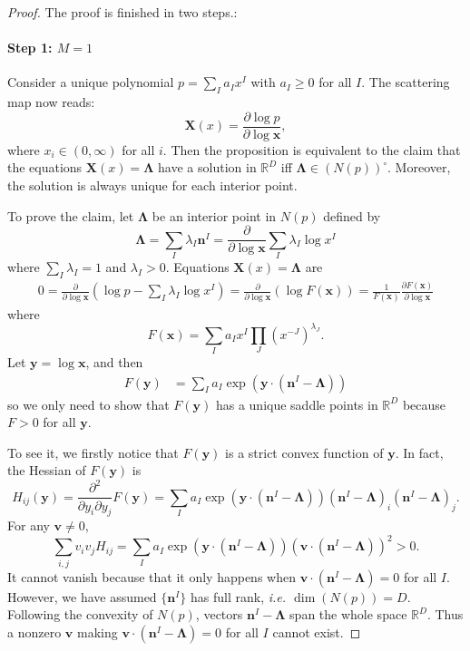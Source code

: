 \documentclass[12pt]{article}
\theoremstyle{definition}
\theoremstyle{plain}
\begin{document}
\begin{proof}
The proof is finished in two steps.:
\paragraph{Step 1: $M=1$}
Consider a unique polynomial $p=\sum_{I} a_I x^I$ with $a_I\geq 0$ for all $I$. The scattering map now reads:
\[
	\mathbf X(x)=\frac{\partial \log p}{\partial \log \mathbf x},
\]
where $x_i\in (0,\infty)$ for all $i$. Then the proposition is equivalent to the claim 
that the equations $\mathbf X(x)=\mathbf\Lambda$ have a solution in $\mathbb R^D$ 
iff $\mathbf\Lambda\in (N(p))^\circ$. Moreover, the solution is always unique for each interior point.

To prove the claim, let $\mathbf{\Lambda}$ be an interior point in $N(p)$ defined by 
\[
	\mathbf \Lambda=\sum_{I}\lambda_I\mathbf n^I
	=\frac{\partial}{\partial \log \mathbf x}\sum_{I}\lambda_I \log x^I
\]
where $\sum_I \lambda_I=1$ and $\lambda_I > 0$. Equations $\mathbf X(x)=\mathbf \Lambda$ are 
\[
\begin{aligned}
	0=\frac{\partial }{\partial \log \mathbf x}\left(
	\log p-\sum_{I}\lambda_I \log x^I
	\right)=\frac{\partial }{\partial \log \mathbf x}\left(
	\log F(\mathbf x)
	\right)=\frac{1}{F(\mathbf x)}\frac{\partial F(\mathbf x)}{\partial \log \mathbf x}
\end{aligned}
\]
where
\[
	F(\mathbf x)=\sum_I a_I x^I\prod_J (x^{-J})^{\lambda_J}.
\]
Let $\mathbf y=\log \mathbf x$, and then
\[
	\begin{aligned}
		F(\mathbf y)
		&=\sum_I a_I \exp\left(\mathbf{y}\cdot \left(\mathbf{n}^I-\mathbf{\Lambda}\right)\right)
	\end{aligned}
\]
so we only need to show that $F(\mathbf y)$ has a unique saddle points in $\mathbb R^D$ 
because $F>0$ for all $\mathbf y$.

To see it, we firstly notice that $F(\mathbf y)$ is a strict convex function of $\mathbf y$. In fact, the Hessian of $F(\mathbf y)$ is 
\[
	H_{ij}(\mathbf y)=\frac{\partial^2}{\partial y_i\partial y_j}F(\mathbf y)=\sum_I a_I \exp\left(\mathbf{y}\cdot \left(\mathbf{n}^I-\mathbf{\Lambda}\right)\right)\left(\mathbf{n}^I-\mathbf{\Lambda}\right)_i\left(\mathbf{n}^I-\mathbf{\Lambda}\right)_j.
\]
For any $\mathbf v\neq 0$, 
\[
	\sum_{i,j}v_iv_jH_{ij}=\sum_I a_I \exp\left(\mathbf{y}\cdot \left(\mathbf{n}^I-\mathbf{\Lambda}\right)\right) \left(\mathbf v\cdot (\mathbf{n}^I-\mathbf{\Lambda})\right)^2 >0.
\]
It cannot vanish because that it only happens when $\mathbf v\cdot (\mathbf{n}^I-\mathbf{\Lambda})=0$ 
for all $I$. However, we have assumed $\{\mathbf n^I\}$ has full rank, {\it i.e. $\dim(N(p))=D$}. 
Following the convexity of $N(p)$, vectors $\mathbf{n}^I-\mathbf{\Lambda}$ span the whole space 
$\mathbb R^D$. Thus a nonzero $\mathbf v$  making $\mathbf v\cdot (\mathbf{n}^I-\mathbf{\Lambda})=0$
for all $I$ cannot exist.


\end{proof}
\end{document}
